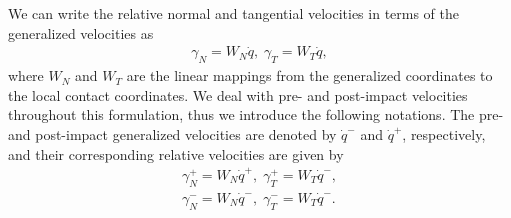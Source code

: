 {\color{red} We can write the relative normal and tangential velocities in terms
of the generalized velocities as 
%
\begin{align*}
  \gamma_N = W_N \dot{q}, \; \gamma_T = W_T \dot{q},
\end{align*}  
\noindent where $W_N$ and $W_T$ are the linear mappings from the generalized
coordinates to the local contact coordinates.
%
We deal with pre- and post-impact velocities throughout this formulation, thus we
introduce the following notations.
%
The pre- and post-impact generalized velocities are denoted by $\dot{q}^-$ and
$\dot{q}^+$, respectively, and their corresponding relative velocities are given
by
\begin{align*}
  \gamma_N^+ = W_N\dot{q}^+, \; \gamma_T^+ = W_T\dot{q}^-, \\
  \gamma_N^- = W_N\dot{q}^-, \; \gamma_T^- = W_T\dot{q}^-.
\end{align*}

}
